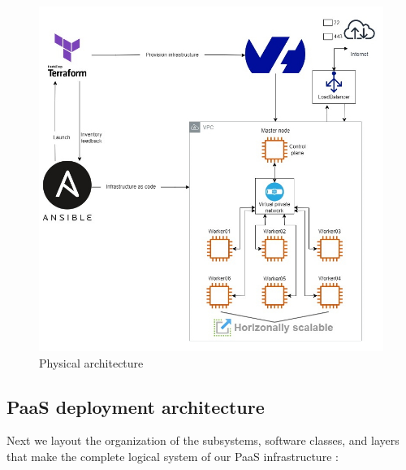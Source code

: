 \begin{figure}[H]\centering
\includegraphics[width=1.0\textwidth,angle=00]{assets/f7.jpg}
\caption{Physical architecture}
\label{fig:f7}
\end{figure}

\subsection{PaaS deployment architecture} 
Next we layout the organization of the subsystems, software classes, and layers that make the complete logical system of our PaaS infrastructure :

